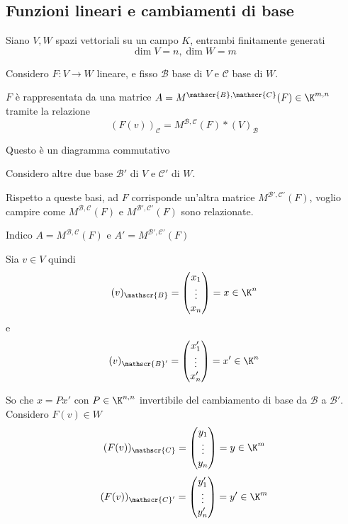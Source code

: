 \subsection{Funzioni lineari e cambiamenti di base}

Siano $ V, W $ spazi vettoriali su un campo $ K$, entrambi finitamente generati \[
    \dim  V = n, \dim W =m
\]

Considero $ F:V\to W $ lineare, e fisso $ \mathscr{B} $ base di $ V $ e $ \mathscr{C} $ base di $ W $. 

$ F $ è rappresentata da una matrice $A = M^{ \mathscr{B}, \mathscr{C}}(F) \in \K^{m,n}$ tramite la relazione \[(F(v))_{ \mathscr{C}}=M^{ \mathscr{B}, \mathscr{C}}(F)*(V)_{\mathscr{B}}\]


Questo è un diagramma commutativo

Considero altre due base $ \mathscr{B}' $ di $ V$ e $ \mathscr{C}' $ di $ W $. 

Rispetto a queste basi, ad $ F $ corrisponde un'altra matrice $ M^{ \mathscr{B}', \mathscr{C}'}(F) $, voglio campire come $ M^{ \mathscr{B}, \mathscr{C}}(F) $ e $ M^{ \mathscr{B}', \mathscr{C}'}(F) $ sono relazionate.

Indico $ A=M^{ \mathscr{B}, \mathscr{C}}(F) $ e $ A'=M^{ \mathscr{B}', \mathscr{C}'}(F) $

Sia $ v \in V $ quindi \[
    (v)_{ \mathscr{B}}=\begin{pmatrix}
        x_1\\ \vdots \\ x_{n} 
    \end{pmatrix}= x \in \K^n
\] e \[
    (v)_{ \mathscr{B}'}=\begin{pmatrix}
        x_1'\\ \vdots \\ x_{n}'
    \end{pmatrix}= x' \in \K^n
\]

So che $ x=P x' $ con $ P \in \K^{n,n} $ invertibile del cambiamento di base da $ \mathscr{B} $ a $ \mathscr{B}' $. Considero $ F(v) \in W $
\[
    (F(v))_{ \mathscr{C}}=\begin{pmatrix}
        y_1\\ \vdots \\ y_{n} 
    \end{pmatrix}= y \in \K^m
\]
\[
    (F(v))_{ \mathscr{C}'}=\begin{pmatrix}
        y_1'\\ \vdots \\ y_{n}' 
    \end{pmatrix}= y' \in \K^m
\]

